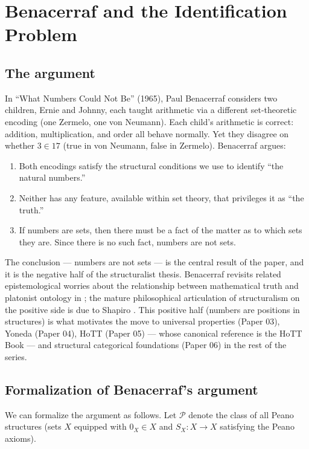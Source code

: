 \documentclass[12pt]{article}
\theoremstyle{definition}
\theoremstyle{remark}
\begin{document}
\section{Benacerraf and the Identification Problem}
\label{sec:benacerraf}

\subsection{The argument}

In ``What Numbers Could Not Be'' (1965), Paul Benacerraf
\cite{benacerraf1965} considers two children, Ernie and Johnny, each taught
arithmetic via a different set-theoretic encoding (one Zermelo, one von
Neumann). Each child's arithmetic is correct: addition, multiplication, and
order all behave normally. Yet they disagree on whether $3 \in 17$ (true in
von Neumann, false in Zermelo). Benacerraf
argues:

\begin{enumerate}[label=(\roman*)]
\item Both encodings satisfy the structural conditions we use to identify
``the natural numbers.''
\item Neither has any feature, available within set theory, that privileges
it as ``the truth.''
\item If numbers are sets, then there must be a fact of the matter as to
which sets they are. Since there is no such fact, numbers are not sets.
\end{enumerate}

The conclusion --- numbers are not sets --- is the central result of the
paper, and it is the negative half of the structuralist thesis. Benacerraf
revisits related epistemological worries about the relationship between
mathematical truth and platonist ontology in \cite{benacerraf1973}; the
mature philosophical articulation of structuralism on the positive side is
due to Shapiro \cite{shapiro1997}. This positive half (numbers are positions
in structures) is what motivates the move to universal properties (Paper 03),
Yoneda (Paper 04), HoTT (Paper 05) --- whose canonical reference is the HoTT
Book \cite{HoTTBook} --- and structural categorical foundations (Paper 06)
in the rest of the series.

\subsection{Formalization of Benacerraf's argument}

We can formalize the argument as follows. Let $\mathcal{P}$ denote the
class of all Peano structures (sets $X$ equipped with $0_X \in X$ and
$S_X: X \to X$ satisfying the Peano axioms).
\end{document}
